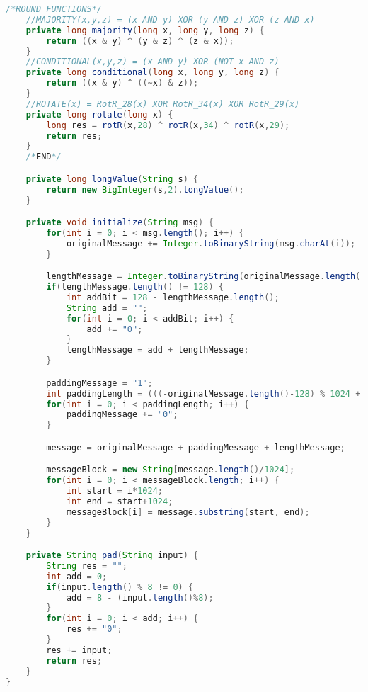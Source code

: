 \begin{lstlisting}[language=Java,basicstyle=\tiny,caption=Sha512.java]
    /*ROUND FUNCTIONS*/
    //MAJORITY(x,y,z) = (x AND y) XOR (y AND z) XOR (z AND x)
    private long majority(long x, long y, long z) {
        return ((x & y) ^ (y & z) ^ (z & x));
    }
    //CONDITIONAL(x,y,z) = (x AND y) XOR (NOT x AND z)
    private long conditional(long x, long y, long z) {
        return ((x & y) ^ ((~x) & z));
    }
    //ROTATE(x) = RotR_28(x) XOR RotR_34(x) XOR RotR_29(x)
    private long rotate(long x) {
        long res = rotR(x,28) ^ rotR(x,34) ^ rotR(x,29);
        return res;
    }
    /*END*/

    private long longValue(String s) {
        return new BigInteger(s,2).longValue();
    }

    private void initialize(String msg) {
        for(int i = 0; i < msg.length(); i++) {
            originalMessage += Integer.toBinaryString(msg.charAt(i));
        }

        lengthMessage = Integer.toBinaryString(originalMessage.length());
        if(lengthMessage.length() != 128) {
            int addBit = 128 - lengthMessage.length();
            String add = "";
            for(int i = 0; i < addBit; i++) {
                add += "0";
            }
            lengthMessage = add + lengthMessage;
        }

        paddingMessage = "1";
        int paddingLength = (((-originalMessage.length()-128) % 1024 + 1024) % 1024) - 1;
        for(int i = 0; i < paddingLength; i++) {
            paddingMessage += "0";
        }

        message = originalMessage + paddingMessage + lengthMessage;

        messageBlock = new String[message.length()/1024];
        for(int i = 0; i < messageBlock.length; i++) {
            int start = i*1024;
            int end = start+1024;
            messageBlock[i] = message.substring(start, end);
        }
    }

    private String pad(String input) {
        String res = "";
        int add = 0;
        if(input.length() % 8 != 0) {
            add = 8 - (input.length()%8);
        }
        for(int i = 0; i < add; i++) {
            res += "0";
        }
        res += input;
        return res;
    }
}

\end{lstlisting}

